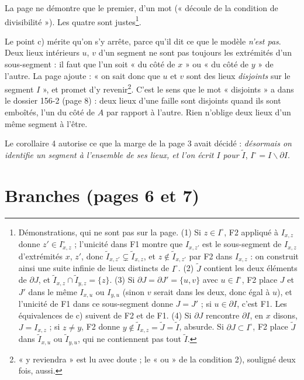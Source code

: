 \documentclass[11pt,a4paper]{article}
\begin{document}
La page ne démontre que le premier, d'un mot (« découle de la condition de
divisibilité »). Les quatre sont justes\footnote{Démonstrations, qui ne sont
pas sur la page. (1) Si $z \in I^{\circ}$, F2 appliqué à $I_{x,z}$ donne $z'
\in I_{x,z}^{\circ}$ ; l'unicité dans F1 montre que $I_{x,z'}$ est le
sous-segment de $I_{x,z}$ d'extrémités $x$, $z'$, donc
$\widetilde{I}_{x,z'} \subsetneq \widetilde{I}_{x,z}$, et $z \notin
\widetilde{I}_{x,z'}$ par F2 dans $I_{x,z}$ : on construit ainsi une suite
infinie de lieux distincts de $I^{\circ}$. (2) $\widetilde{J}$ contient les
deux éléments de $\partial J$, et $\widetilde{I}_{x,z} \cap
\widetilde{I}_{y,z} = \{z\}$. (3) Si $\partial J = \partial J' = \{u,v\}$ avec
$u \in I^{\circ}$, F2 place $J$ et $J'$ dans le même $I_{x,u}$ ou $I_{y,u}$
(sinon $v$ serait dans les deux, donc égal à $u$), et l'unicité de F1 dans ce
sous-segment donne $J = J'$ ; si $u \in \partial I$, c'est F1. Les
équivalences de c) suivent de F2 et de F1. (4) Si $\partial J$ rencontre
$\partial I$, en $x$ disons, $J = I_{x,z}$ ; si $z \neq y$, F2 donne $y \notin
\widetilde{I}_{x,z} = \widetilde{J} = \widetilde{I}$, absurde. Si $\partial J
\subset I^{\circ}$, F2 place $\widetilde{J}$ dans $\widetilde{I}_{x,u}$ ou
$\widetilde{I}_{y,u}$, qui ne contiennent pas tout $\widetilde{I}$.}.

Le point c) mérite qu'on s'y arrête, parce qu'il dit ce que le modèle
\emph{n'est pas}. Deux lieux intérieurs $u$, $v$ d'un segment ne sont pas
toujours les extrémités d'un sous-segment : il faut que l'un soit « du côté
de $x$ » ou « du côté de $y$ » de l'autre. La page ajoute : « on sait donc que
$u$ et $v$ sont des lieux \emph{disjoints} sur le segment $I$ », et promet
d'y revenir\footnote{« y reviendra » est lu avec doute ; le « ou » de la
condition 2), souligné deux fois, aussi.}. C'est le sens que le mot
« disjoints » a dans le dossier 156-2 (page 8) : deux lieux d'une faille sont
disjoints quand ils sont emboîtés, l'un du côté de $A$ par rapport à l'autre.
Rien n'oblige deux lieux d'un même segment à l'être.

Le corollaire 4 autorise ce que la marge de la page 3 avait décidé :
\emph{désormais on identifie un segment à l'ensemble de ses lieux, et l'on
écrit $I$ pour $\widetilde{I}$}, $I^{\circ} = I \smallsetminus \partial I$.

\section*{Branches (pages 6 et 7)}
\end{document}
